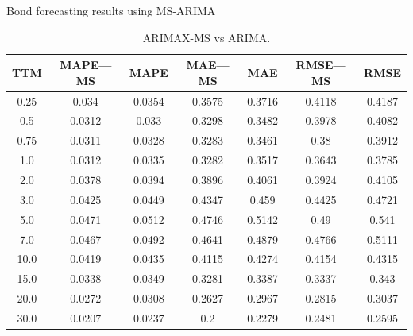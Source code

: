 \documentclass[aspectratio=169]{beamer}
\begin{document}
    \begin{frame}{Bond forecasting results using MS-ARIMA}
        \begin{table}[H]
            \begin{center}
                \begin{tabular}{|c|c|c|c|c|c|c|}
                    \hline
                    TTM    & MAPE---MS  & MAPE      & MAE---MS    & MAE       & RMSE---MS    & RMSE  \\ \hline
                    0.25   &0.034       & 0.0354    & 0.3575      & 0.3716    &0.4118        &0.4187 \\ \hline
                    0.5    &0.0312      & 0.033     & 0.3298      & 0.3482    &0.3978        &0.4082 \\ \hline
                    0.75   &0.0311      & 0.0328    & 0.3283      & 0.3461    &0.38          &0.3912   \\ \hline
                    1.0    &0.0312      & 0.0335    & 0.3282      & 0.3517    &0.3643        &0.3785 \\ \hline
                    2.0    &0.0378      & 0.0394    & 0.3896      & 0.4061    &0.3924        &0.4105 \\ \hline
                    3.0    &0.0425      & 0.0449    & 0.4347      & 0.459     &0.4425        &0.4721 \\ \hline
                    5.0    &0.0471      & 0.0512    & 0.4746      & 0.5142    &0.49          &0.541   \\ \hline
                    7.0    &0.0467      & 0.0492    & 0.4641      & 0.4879    &0.4766        &0.5111 \\ \hline
                    10.0   &0.0419      & 0.0435    & 0.4115      & 0.4274    &0.4154        &0.4315 \\ \hline
                    15.0   &0.0338      & 0.0349    & 0.3281      & 0.3387    &0.3337        &0.343 \\ \hline
                    20.0   &0.0272      & 0.0308    & 0.2627      & 0.2967    &0.2815        &0.3037 \\ \hline
                    30.0   &0.0207      & 0.0237    & 0.2         & 0.2279    &0.2481        &0.2595 \\ \hline
                \end{tabular}
                \caption{ARIMAX-MS vs ARIMA.}
            \end{center}
        \end{table} 
    \end{frame}
\end{document}
